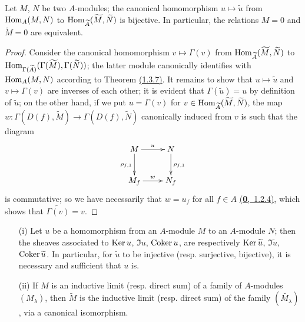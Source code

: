 \begin{cor}[1.3.8]
\label{cor-1.1.3.8}
Let $M$, $N$ be two $A$-modules; the canonical homomorphism $u\mapsto\widetilde{u}$ from
${\mathop{\mathrm{Hom}}\nolimits}_A(M,N)$ to ${\mathop{\mathrm{Hom}}\nolimits}_{\widetilde{A}}(\widetilde{M},\widetilde{N})$ is bijective. In
particular, the relations $M=0$ and $\widetilde{M}=0$ are equivalent.
\end{cor}

\begin{proof}
\label{proof-cor-1.1.3.8}
Consider the canonical homomorphism $v\mapsto\Gamma(v)$ from
${\mathop{\mathrm{Hom}}\nolimits}_{\widetilde{A}}(\widetilde{M},\widetilde{N})$ to
${\mathop{\mathrm{Hom}}\nolimits}_{\Gamma(\widetilde{A})}(\Gamma(\widetilde{M}),\Gamma(\widetilde{N}))$; the latter
module canonically identifies with ${\mathop{\mathrm{Hom}}\nolimits}_A(M,N)$ according to Theorem \hyperref[thm-1.1.3.7]{(1.3.7)}.
It remains to show that $u\mapsto\widetilde{u}$ and $v\mapsto\Gamma(v)$ are inverses of each
other; it is evident that $\Gamma(\widetilde{u})=u$ by definition of $\widetilde{u}$; on the
other hand, if we put $u=\Gamma(v)$ for
$v\in{\mathop{\mathrm{Hom}}\nolimits}_{\widetilde{A}}(\widetilde{M},\widetilde{N})$, the map
$w:\Gamma(D(f),\widetilde{M})\to\Gamma(D(f),\widetilde{N})$ canonically induced from $v$
is such that the diagram
\[
  \xymatrix{
    M\ar[r]^u\ar[d]_{\rho_{f,1}} & N\ar[d]^{\rho_{f,1}}\\
    M_f\ar[r]^w & N_f
  }
\]
is commutative; so we have necessarily that $w=u_f$ for all $f\in A$
\hyperref[env-0.1.2.4]{(\textbf{0},~1.2.4)}, which shows that $\widetilde{\Gamma(v)}=v$.
\end{proof}

\begin{cor}[1.3.9]
\label{cor-1.1.3.9}
\medskip\noindent
\begin{itemize}
  \item[{\rm(i)}] Let $u$ be a homomorphism from an $A$-module $M$ to an $A$-module $N$; then the
    sheaves associated to ${\mathop{\mathrm{Ker}}\nolimits}\, u$, $\Im u$, ${\mathop{\mathrm{Coker}}\nolimits}\, u$, are respectively
    ${\mathop{\mathrm{Ker}}\nolimits}\,\widetilde{u}$, $\Im\widetilde{u}$, ${\mathop{\mathrm{Coker}}\nolimits}\,\widetilde{u}$. In particular, for
    $\widetilde{u}$ to be injective (resp. surjective, bijective), it is necessary and
    sufficient that $u$ is.
  \item[{\rm(ii)}] If $M$ is an inductive limit (resp. direct sum) of a family of $A$-modules
    $(M_\lambda)$, then $\widetilde{M}$ is the inductive limit (resp. direct sum) of the
    family $(\widetilde{M_\lambda})$, via a canonical isomorphism.
\end{itemize}
\end{cor}

